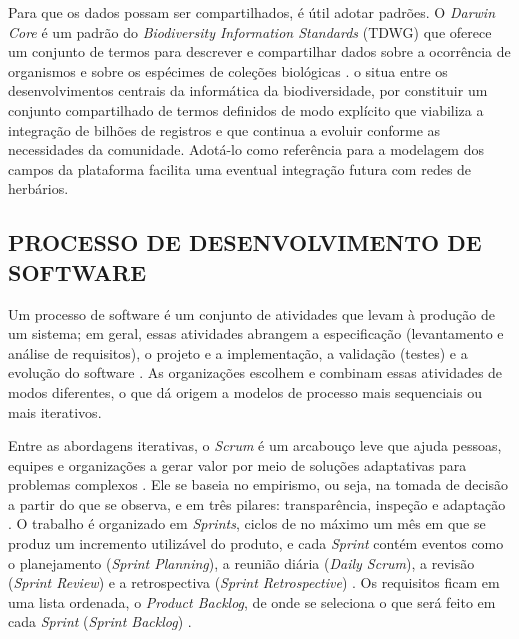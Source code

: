 \documentclass[
    12pt,        %
    openany,     %
    oneside,     %
    a4paper,     %
    english,     %
    french,      %
    spanish,     %
    brazil,      %
    article      %
]{abntex2}
\begin{document}
Para que os dados possam ser compartilhados, é útil adotar padrões. O \textit{Darwin Core} é um padrão do \textit{Biodiversity Information Standards} (TDWG) que oferece um conjunto de termos para descrever e compartilhar dados sobre a ocorrência de organismos e sobre os espécimes de coleções biológicas \cite{tdwg2009darwincore}.  o situa entre os desenvolvimentos centrais da informática da biodiversidade, por constituir um conjunto compartilhado de termos definidos de modo explícito que viabiliza a integração de bilhões de registros e que continua a evoluir conforme as necessidades da comunidade. Adotá-lo como referência para a modelagem dos campos da plataforma facilita uma eventual integração futura com redes de herbários.

\subsection{PROCESSO DE DESENVOLVIMENTO DE SOFTWARE}
\label{subsec:processo-software}

Um processo de software é um conjunto de atividades que levam à produção de um sistema; em geral, essas atividades abrangem a especificação (levantamento e análise de requisitos), o projeto e a implementação, a validação (testes) e a evolução do software \cite{sommerville2011}. As organizações escolhem e combinam essas atividades de modos diferentes, o que dá origem a modelos de processo mais sequenciais ou mais iterativos.

Entre as abordagens iterativas, o \textit{Scrum} é um arcabouço leve que ajuda pessoas, equipes e organizações a gerar valor por meio de soluções adaptativas para problemas complexos \cite{schwaber2020scrum}. Ele se baseia no empirismo, ou seja, na tomada de decisão a partir do que se observa, e em três pilares: transparência, inspeção e adaptação \cite{schwaber2020scrum}. O trabalho é organizado em \textit{Sprints}, ciclos de no máximo um mês em que se produz um incremento utilizável do produto, e cada \textit{Sprint} contém eventos como o planejamento (\textit{Sprint Planning}), a reunião diária (\textit{Daily Scrum}), a revisão (\textit{Sprint Review}) e a retrospectiva (\textit{Sprint Retrospective}) \cite{schwaber2020scrum}. Os requisitos ficam em uma lista ordenada, o \textit{Product Backlog}, de onde se seleciona o que será feito em cada \textit{Sprint} (\textit{Sprint Backlog}) \cite{schwaber2020scrum}.
\end{document}
